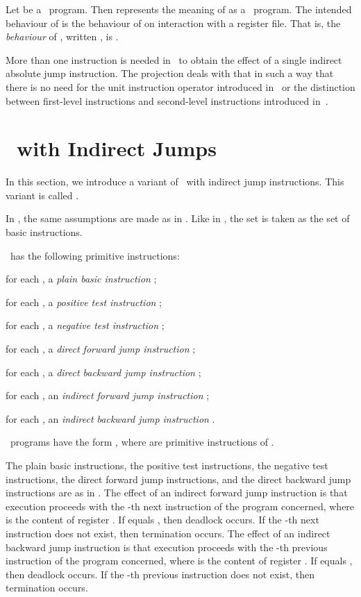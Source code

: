 \documentclass[fleqn]{llncs}
\begin{document}
Let  be a \PGLDij\ program.
Then  represents the meaning of  as a \PGLD\ program.
The intended behaviour of  is the behaviour of  on
interaction with a register file.
That is, the \emph{behaviour} of , written , is
.

More than one instruction is needed in \PGLD\ to obtain the effect of a
single indirect absolute jump instruction.
The projection  deals with that in such a way that there is
no need for the unit instruction operator introduced in~\cite{Pon02a} or
the distinction between first-level instructions and second-level
instructions introduced in~\cite{BB06a}.

\section{\PGLC\ with Indirect Jumps}
\label{sect-PGLCij}

In this section, we introduce a variant of \PGLC\ with indirect jump
instructions.
This variant is called \PGLCij.

In \PGLCij, the same assumptions are made as in \PGLDij.
Like in \PGLDij, the set  is
taken as the set  of basic instructions.

\PGLDij\ has the following primitive instructions:
\begin{iteml}
\item
for each , a \emph{plain basic instruction} ;
\item
for each , a \emph{positive test instruction} ;
\item
for each , a \emph{negative test instruction} ;
\item
for each , a \emph{direct forward jump instruction}
;
\item
for each , a \emph{direct backward jump instruction}
;
\item
for each , an \emph{indirect forward jump instruction}
;
\item
for each , an \emph{indirect backward jump instruction}
.
\end{iteml}
\PGLCij\ programs have the form , where
 are primitive instructions of \PGLCij.

The plain basic instructions, the positive test instructions, the
negative test instructions, the direct forward jump instructions, and
the direct backward jump instructions are as in \PGLC.
The effect of an indirect forward jump instruction  is that
execution proceeds with the -th next instruction of the program
concerned, where  is the content of register .
If  equals , then deadlock occurs.
If the -th next instruction does not exist, then termination occurs.
The effect of an indirect backward jump instruction  is that
execution proceeds with the -th previous instruction of the program
concerned, where  is the content of register .
If  equals , then deadlock occurs.
If the -th previous instruction does not exist, then termination
occurs.
\end{document}
